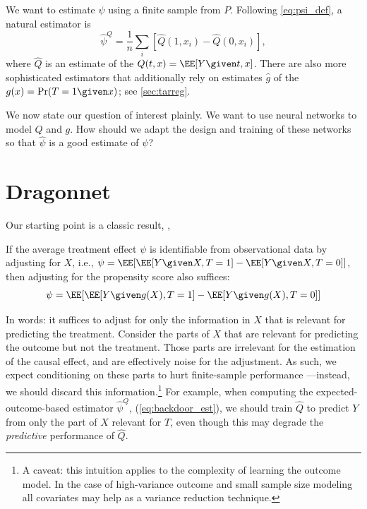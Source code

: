 \documentclass{article}
\begin{document}
We want to estimate $\psi$ using a finite sample from $P$.
Following \cref{eq:psi_def}, a natural estimator is
\begin{equation}
\hat{\psi}^{Q}=\frac{1}{n}\sum_{i}\left[\hat{Q}(1,x_{i})-\hat{Q}(0,x_{i})\right],\label{eq:backdoor_est}
\end{equation}
where $\hat{Q}$ is an estimate of the  $Q(t,x)=\EE[Y \given t,x]$.
There are also more sophisticated estimators that additionally rely on estimates $\hat{g}$ of the
 $g(x) = \Pr(T=1 \given x)$; see \cref{sec:tarreg}.

We now state our question of interest plainly.
We want to use neural networks to model $Q$ and $g$.
How should we adapt the design and training of these networks so that $\hat{\psi}$ is
a good estimate of $\psi$?

\section{Dragonnet}
\label{sec:Dragonnet}
Our starting point is a classic result, \cite[][Thm.~3]{Rosenbaum:Rubin:1983},
\begin{theorem}  \label{Dragonnettheorem}
  If the average treatment effect $\psi$ is identifiable from observational data
  by adjusting for $X$, i.e., $\psi = \EE[\EE[Y\given X,T=1]-\EE[Y\given X,T=0]]$,
  then adjusting for the propensity score also suffices:
  \[
    \psi = \EE[\EE[Y \given g(X),T=1]-\EE[Y \given g(X),T=0]]
  \]
\end{theorem}

In words: it suffices to adjust for only the information in $X$ that is relevant for predicting the treatment.
Consider the parts of $X$ that are relevant for predicting the outcome but not the treatment.
Those parts are irrelevant for the estimation of the causal effect, and are effectively noise for the adjustment.
As such, we expect conditioning on these parts to hurt finite-sample performance ---instead, we should discard this information.\footnote{A caveat: this intuition applies to the complexity of learning the outcome model. In the case of high-variance outcome and small sample size
  modeling all covariates may help as a variance reduction technique.}
For example, when computing the expected-outcome-based estimator $\hat{\psi}^{Q}$, (\cref{eq:backdoor_est}), we should
train $\hat{Q}$ to predict $Y$ from only the part of $X$ relevant for $T$, even though this may degrade the \emph{predictive} performance of $\hat{Q}$.
   
\end{document}

